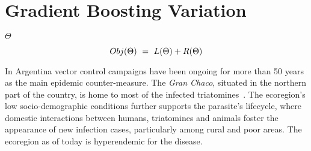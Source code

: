 \section{Gradient Boosting Variation}


$\Theta$

\begin{equation} \label{eq:objFunction}
Obj(\Theta) \ = \ L(\Theta) + R(\Theta)
\\
\end{equation}


In Argentina vector control campaigns have been ongoing for more than 50 years as the main epidemic counter-measure. The \textit{Gran Chaco}, situated in the northern part of the country, is home to most of the infected triatomines~\cite{OPS2014mapa}. The ecoregion's low socio-demographic conditions further supports the parasite's lifecycle, where domestic interactions between humans, triatomines and animals foster the appearance of new infection cases, particularly among rural and poor areas. The ecoregion as of today is hyperendemic for the disease.






